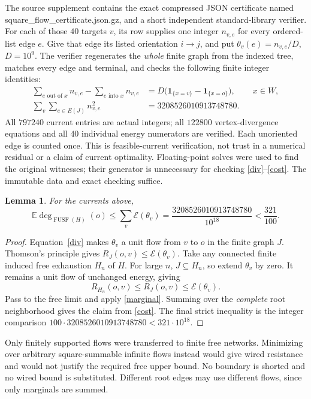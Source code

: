 \documentclass[11pt]{article}
\newtheorem{lemma}[theorem]{Lemma}
\theoremstyle{remark}\newtheorem{remark}[theorem]{Remark}
\newcommand{\FUSF}{\operatorname{FUSF}}
\newcommand{\E}{\mathbb E}
\newcommand{\energy}{\mathcal E}
\begin{document}
The source supplement contains the exact compressed JSON certificate
named square\_\allowbreak{}flow\_\allowbreak{}certificate.json.gz, and a short independent
standard-library verifier.
For each of those \(40\) targets \(v\), its row supplies one integer
\(n_{v,e}\) for every ordered-list edge \(e\).
Give that edge its listed orientation \(i\to j\), and put
\(\theta_v(e)=n_{v,e}/D\), \(D=10^9\).
The verifier regenerates the \emph{whole} finite graph from the indexed
tree, matches every edge and terminal, and checks the following finite
integer identities:
\begin{align}
 \sum_{e\text{ out of }x}n_{v,e}
 -\sum_{e\text{ into }x}n_{v,e}
 &=D\bigl(\mathbf1_{\{x=v\}}-\mathbf1_{\{x=o\}}\bigr),
       &&x\in W,\label{div}\\
 \sum_v\sum_{e\in E(J)}n_{v,e}^2
 &=3208526010913748780.\label{cost}
\end{align}
All \(797240\) current entries are actual integers;
all \(122800\) vertex-divergence equations and all \(40\) individual
energy numerators are verified. Each unoriented edge is counted once.
This is feasible-current verification, not trust in a numerical residual
or a claim of current optimality. Floating-point solves were used to
find the original witnesses; their generator is unnecessary for checking
\eqref{div}--\eqref{cost}. The immutable data and exact checking suffice.

\begin{lemma}\label{transfer}
For the currents above,
\[
 \E\deg_{\FUSF(H)}(o)
 \le\sum_v\energy(\theta_v)
 =\frac{3208526010913748780}{10^{18}}<\frac{321}{100}.
\]
\end{lemma}
\begin{proof}
Equation~\eqref{div} makes \(\theta_v\) a unit flow from \(v\) to \(o\)
in the finite graph \(J\). Thomson's principle gives
\(R_J(o,v)\le\energy(\theta_v)\).
Take any connected finite induced free exhaustion \(H_n\) of \(H\).
For large \(n\), \(J\subseteq H_n\), so extend \(\theta_v\) by zero.
It remains a unit flow of unchanged energy, giving
\[
 R_{H_n}(o,v)\le R_J(o,v)\le\energy(\theta_v).
\]
Pass to the free limit and apply \eqref{marginal}.
Summing over the \emph{complete} root neighborhood gives the claim
from \eqref{cost}. The final strict inequality is the integer comparison
\(100\cdot3208526010913748780<321\cdot10^{18}\).
\end{proof}

Only finitely supported flows were transferred to finite free networks.
Minimizing over arbitrary square-summable infinite flows instead would
give wired resistance and would not justify the required free upper
bound. No boundary is shorted and no wired bound is substituted.
Different root edges may use different flows, since only marginals are
summed.
\end{document}
